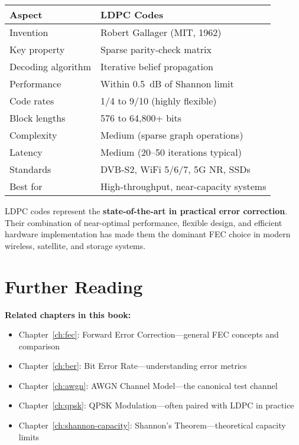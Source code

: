 \begin{center}
\begin{tabular}{@{}ll@{}}
\toprule
\textbf{Aspect} & \textbf{LDPC Codes} \\
\midrule
Invention & Robert Gallager (MIT, 1962) \\
Key property & Sparse parity-check matrix \\
Decoding algorithm & Iterative belief propagation \\
Performance & Within 0.5~dB of Shannon limit \\
Code rates & 1/4 to 9/10 (highly flexible) \\
Block lengths & 576 to 64,800+ bits \\
Complexity & Medium (sparse graph operations) \\
Latency & Medium (20--50 iterations typical) \\
Standards & DVB-S2, WiFi 5/6/7, 5G NR, SSDs \\
Best for & High-throughput, near-capacity systems \\
\bottomrule
\end{tabular}
\end{center}

\begin{keyconcept}
LDPC codes represent the \textbf{state-of-the-art in practical error correction}. Their combination of near-optimal performance, flexible design, and efficient hardware implementation has made them the dominant FEC choice in modern wireless, satellite, and storage systems.
\end{keyconcept}

\section{Further Reading}

\textbf{Related chapters in this book:}
\begin{itemize}
\item Chapter~\ref{ch:fec}: Forward Error Correction---general FEC concepts and comparison
\item Chapter~\ref{ch:ber}: Bit Error Rate---understanding error metrics
\item Chapter~\ref{ch:awgn}: AWGN Channel Model---the canonical test channel
\item Chapter~\ref{ch:qpsk}: QPSK Modulation---often paired with LDPC in practice
\item Chapter~\ref{ch:shannon-capacity}: Shannon's Theorem---theoretical capacity limits
\end{itemize}

